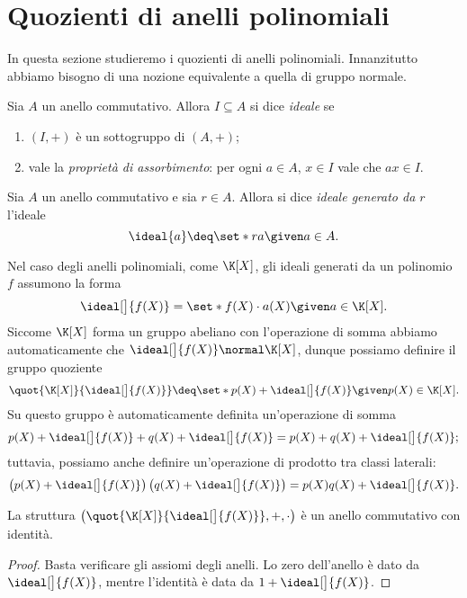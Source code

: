 \section{Quozienti di anelli polinomiali}

In questa sezione studieremo i quozienti di anelli polinomiali. Innanzitutto abbiamo bisogno di una nozione equivalente a quella di gruppo normale.

\begin{definition}
    [Ideale] Sia $A$ un anello commutativo. Allora $I \subseteq A$ si dice \emph{ideale} se \begin{enumerate}
        \item $(I, +)$ è un sottogruppo di $(A, +)$;
        \item vale la \emph{proprietà di assorbimento}: per ogni $a \in A$, $x \in I$ vale che $ax \in I$.
    \end{enumerate}
\end{definition}

\begin{definition}
    Sia $A$ un anello commutativo e sia $r \in A$. Allora si dice \emph{ideale generato da $r$} l'ideale \[
        \ideal{a} \deq \set*{ra \given a \in A}.    
    \]
\end{definition}

Nel caso degli anelli polinomiali, come $\K[X]$, gli ideali generati da un polinomio $f$ assumono la forma \[
    \ideal[\big]{f(X)} = \set*{f(X)\cdot a(X) \given a \in \K[X]}.    
\] Siccome $\K[X]$ forma un gruppo abeliano con l'operazione di somma abbiamo automaticamente che $\ideal[\big]{f(X)} \normal \K[X]$, dunque possiamo definire il gruppo quoziente \[
    \quot{\K[X]}{\ideal[\big]{f(X)}} \deq \set*{p(X) + \ideal[\big]{f(X)} \given p(X) \in \K[X]}.
\] Su questo gruppo è automaticamente definita un'operazione di somma \[
    p(X) + \ideal[\big]{f(X)} + q(X) + \ideal[\big]{f(X)} = p(X) + q(X) + \ideal[\big]{f(X)};
\] tuttavia, possiamo anche definire un'operazione di prodotto tra classi laterali: \[
    \left( p(X) + \ideal[\big]{f(X)} \right)\left( q(X) + \ideal[\big]{f(X)} \right) = p(X)q(X) + \ideal[\big]{f(X)}.
\] 

\begin{theorem}
    La struttura $\left( \quot{\K[X]}{\ideal[\big]{f(X)}}, +, \cdot \right)$ è un anello commutativo con identità.
\end{theorem}
\begin{proof}
    Basta verificare gli assiomi degli anelli. Lo zero dell'anello è dato da $\ideal[\big]{f(X)}$, mentre l'identità è data da $1 + \ideal[\big]{f(X)}$.
\end{proof}

